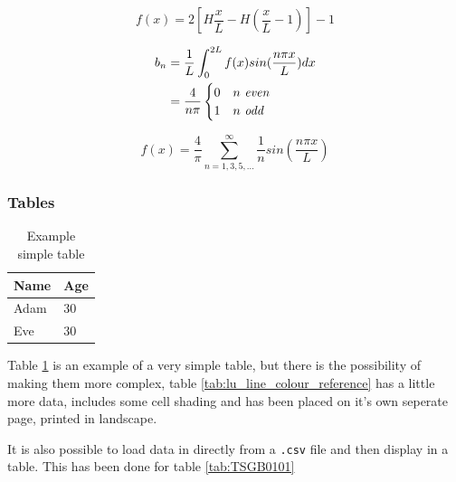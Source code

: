\begin{equation}
    \label{eq:1}
    f(x) = 2[H \frac{x}{L} - H(\frac{x}{L} - 1)] - 1
\end{equation}

\begin{equation}
    \label{eq:2}
    \begin{split}
        b_n & = \frac{1}{L} \int_0^{2L} f(x) sin(\frac{n \pi x}{L}) dx \\
            & = \frac{4}{n \pi} 
        \begin{cases}
            0 &\text{$n$ \textit{even}} \\
            1 &\text{$n$ \textit{odd}}
        \end{cases}
    \end{split}
\end{equation}

\begin{equation}
    \label{eq:3}
    f(x) = \frac{4}{\pi} \sum_{n=1,3,5,\ldots}^\infty \frac{1}{n} sin(\frac{n \pi x}{L})
\end{equation}

\subsubsection{Tables}

\begin{table}[h]
\centering
\caption{Example simple table}
\label{tab:simple-table}
\begin{tabular}{@{}ll@{}}
\toprule
Name & Age \\ \midrule
Adam & 30 \\
Eve & 30 \\ \bottomrule
\end{tabular}
\end{table}

Table \ref{tab:simple-table} is an example of a very simple table, but there is the possibility of making them more complex, table \ref{tab:lu_line_colour_reference} has a little more data, includes some cell shading and has been placed on it's own seperate page, printed in landscape.



It is also possible to load data in directly from a \verb|.csv| file and then display in a table. This has been done for table \ref{tab:TSGB0101}

